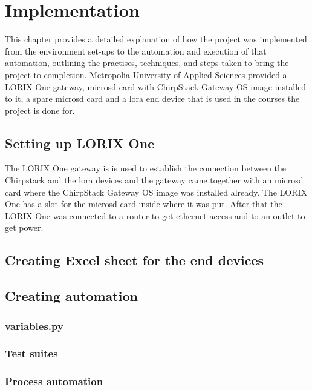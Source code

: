 
\chapter{Implementation} \label{ch:impl}
This chapter provides a detailed explanation of how the project was implemented from the environment set-ups to the automation and execution of that automation, outlining the practises, techniques, and steps taken to bring the project to completion.
Metropolia University of Applied Sciences provided a LORIX One gateway, micro\gls{sd} card with ChirpStack Gateway OS image installed to it, a spare micro\gls{sd} card and a \gls{lora} end device that is used in the courses the project is done for.

\section{Setting up LORIX One}
The LORIX One gateway is is used to establish the connection between the Chirpstack and the \gls{lora} devices and the gateway came together with an micro\gls{sd} card where the ChirpStack Gateway OS image was installed already.
The LORIX One has a slot for the micro\gls{sd} card inside where it was put.
After that the LORIX One was connected to a router to get ethernet access and to an outlet to get power.

\section{}
\section{Creating Excel sheet for the end devices}
\section{Creating automation}
\subsection{variables.py}
\subsection{Test suites}
\subsection{Process automation}


\clearpage %
